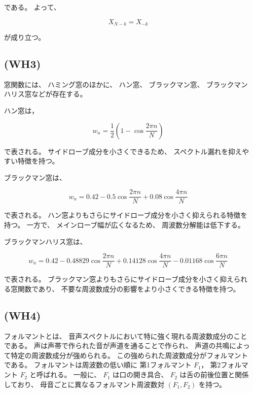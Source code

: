 \documentclass{jsarticle}
\begin{document}
である。
よって、

\begin{equation}
X_{N-k}=X_{-k}
\end{equation}

が成り立つ。

\subsection*{(WH3)}
窓関数には、
ハミング窓のほかに、
ハン窓、
ブラックマン窓、
ブラックマンハリス窓などが存在する。

ハン窓は，

\begin{equation}
w_n
=
\frac{1}{2}
\left(
1-\cos\frac{2\pi n}{N}
\right)
\end{equation}

で表される。
サイドローブ成分を小さくできるため、
スペクトル漏れを抑えやすい特徴を持つ。

ブラックマン窓は、

\begin{equation}
w_n
=
0.42
-
0.5\cos\frac{2\pi n}{N}
+
0.08\cos\frac{4\pi n}{N}
\end{equation}

で表される。
ハン窓よりもさらにサイドローブ成分を小さく抑えられる特徴を持つ。
一方で、
メインローブ幅が広くなるため、
周波数分解能は低下する。

ブラックマンハリス窓は、

\begin{equation}
w_n
=
0.42
-
0.48829\cos\frac{2\pi n}{N}
+
0.14128\cos\frac{4\pi n}{N}
-
0.01168\cos\frac{6\pi n}{N}
\end{equation}

で表される。
ブラックマン窓よりもさらにサイドローブ成分を小さく抑えられる窓関数であり、
不要な周波数成分の影響をより小さくできる特徴を持つ。

\subsection*{(WH4)}
フォルマントとは、
音声スペクトルにおいて特に強く現れる周波数成分のことである。
声は声帯で作られた音が声道を通ることで作られ、
声道の共鳴によって特定の周波数成分が強められる。
この強められた周波数成分がフォルマントである。
フォルマントは周波数の低い順に
第1フォルマント $F_1$，
第2フォルマント $F_2$
と呼ばれる。
一般に、
$F_1$ は口の開き具合、
$F_2$ は舌の前後位置と関係しており、
母音ごとに異なるフォルマント周波数対 $(F_1,F_2)$ を持つ。
\end{document}
